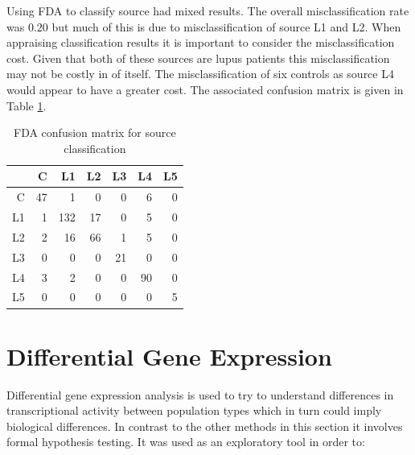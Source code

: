 \documentclass[a4paper, 12pt]{report}
\begin{document}
Using \gls{FDA} to classify source had mixed results. The overall misclassification rate was $0.20$ but much of this is due to misclassification of source L1 and L2. When appraising classification results it is important to consider the misclassification cost. Given that both of these sources are lupus patients this misclassification may not be costly in of itself. The misclassification of six controls as source L4 would appear to have a greater cost. The associated confusion matrix is given in Table \ref{T:confusion2}. %

\begin{table}[h]
\centering
\begin{tabular}{rrrrrrr}
  \hline
 & C & L1 & L2 & L3 & L4 & L5 \\ 
  \hline
C &  47 &   1 &   0 &   0 &   6 &   0 \\ 
  L1 &   1 & 132 &  17 &   0 &   5 &   0 \\ 
  L2 &   2 &  16 &  66 &   1 &   5 &   0 \\ 
  L3 &   0 &   0 &   0 &  21 &   0 &   0 \\ 
  L4 &   3 &   2 &   0 &   0 &  90 &   0 \\ 
  L5 &   0 &   0 &   0 &   0 &   0 &   5 \\ 
   \hline
\end{tabular}
\caption{FDA confusion matrix for source classification} 
\label{T:confusion2}
\end{table}


\section{Differential Gene Expression}
Differential gene expression analysis is used to try to understand differences in transcriptional activity between population types which in turn could imply biological differences. In contrast to the other methods in this section it involves formal hypothesis testing. It was used as an exploratory tool in order to:
\end{document}
